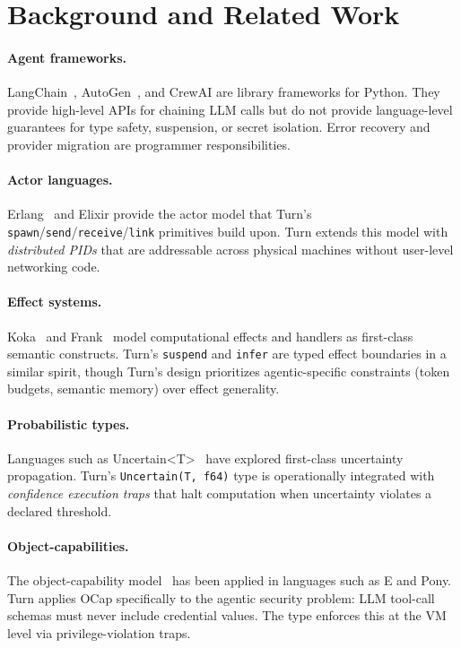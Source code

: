 \documentclass[sigplan,10pt,review,anonymous]{acmart}
\newcommand{\captype}{\mathbf{Cap}}
\begin{document}
\section{Background and Related Work}

\paragraph{Agent frameworks.}
LangChain~\cite{langchain}, AutoGen~\cite{autogen}, and CrewAI are library
frameworks for Python. They provide high-level APIs for chaining LLM calls but
do not provide language-level guarantees for type safety, suspension, or secret
isolation. Error recovery and provider migration are programmer responsibilities.

\paragraph{Actor languages.}
Erlang~\cite{erlang} and Elixir provide the actor model that Turn's
\texttt{spawn}/\texttt{send}/\texttt{receive}/\texttt{link} primitives build upon.
Turn extends this model with \emph{distributed PIDs} that are addressable across
physical machines without user-level networking code.

\paragraph{Effect systems.}
Koka~\cite{koka} and Frank~\cite{frank} model computational effects and handlers
as first-class semantic constructs. Turn's \texttt{suspend} and \texttt{infer}
are typed effect boundaries in a similar spirit, though Turn's design prioritizes
agentic-specific constraints (token budgets, semantic memory) over effect generality.

\paragraph{Probabilistic types.}
Languages such as Uncertain\textless T\textgreater~\cite{uncertain} have explored
first-class uncertainty propagation. Turn's \texttt{Uncertain(T, f64)} type is
operationally integrated with \emph{confidence execution traps} that halt
computation when uncertainty violates a declared threshold.

\paragraph{Object-capabilities.}
The object-capability model~\cite{ocap} has been applied in languages such as
E and Pony. Turn applies OCap specifically to the agentic security problem:
LLM tool-call schemas must never include credential values. The \captype{} type
enforces this at the VM level via privilege-violation traps.
\end{document}

